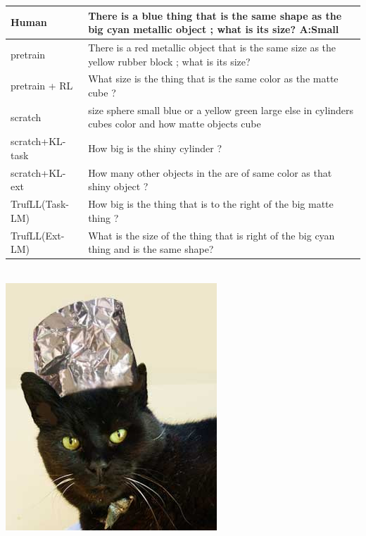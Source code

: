 \documentclass{article}
\newcommand{\algo}{TrufLL\xspace}
\begin{document}
\begin{table}[t!]
\vspace{1mm}
		\scriptsize
		\begin{tabular}{p{}p{}}
			Human           & There is a blue thing that is the same shape as the big cyan metallic object ; what is its size?  \quad \textbf{A:Small} \\
			\midrule
			pretrain        & There is a red metallic object that is the same size as the yellow rubber block ; what is its size? \\
		    pretrain + RL   & What size is the thing that is the same color as the matte cube ? \makebox[0pt][l]{$\square$}\raisebox{.15ex}{\hspace{0.1em}$\checkmark$} \\ \midrule
			scratch         & size sphere small blue or a yellow green large else in cylinders cubes color and how matte objects cube  \\
			scratch+KL-task & How big is the shiny cylinder ? \\
			scratch+KL-ext  & How many other objects in the are of same color as that shiny object ?\\ \midrule
			\algo(Task-LM) & How big is the thing that is to the right of the big matte thing ? \makebox[0pt][l]{$\square$}\raisebox{.15ex}{\hspace{0.1em}$\checkmark$} \\
			\algo(Ext-LM)   & What is the size of the thing that is right of the big cyan thing and is the same shape? \makebox[0pt][l]{$\square$}\raisebox{.15ex}{\hspace{0.1em}$\checkmark$}  \\
			\bottomrule
		\end{tabular}
	\vspace{0.5em}\\
		\centering
        \includegraphics[scale=0.35]{./COCO_val2014_000000177486.jpeg}
	\hfill


\end{table}
\end{document}
